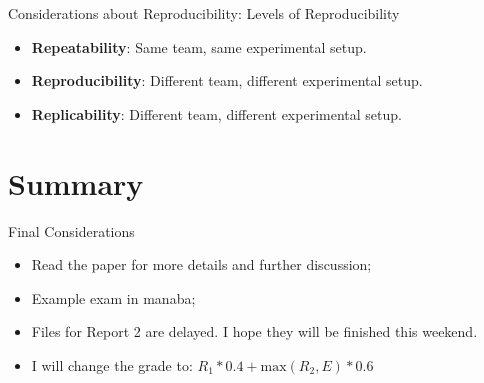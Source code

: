 \documentclass[aspectratio=169]{beamer}
\begin{document}
\begin{frame}{Considerations about Reproducibility: Levels of Reproducibility}
  \begin{itemize}
    \item {\bf Repeatability}: Same team, same experimental setup.\bigskip 
    \item {\bf Reproducibility}: Different team, different experimental setup.\bigskip
    \item {\bf Replicability}: Different team, different experimental setup.
  \end{itemize}
\end{frame}

\section{Summary}

\begin{frame}[t]{Final Considerations}
  \begin{itemize}
    \item Read the paper for more details and further discussion;
    \item Example exam in manaba; 
    \item Files for Report 2 are delayed. I hope they will be finished this weekend.
    \item I will change the grade to: $R_1*0.4 + \text{max}(R_2, E)*0.6$
  \end{itemize}
\end{frame}


\end{document}
